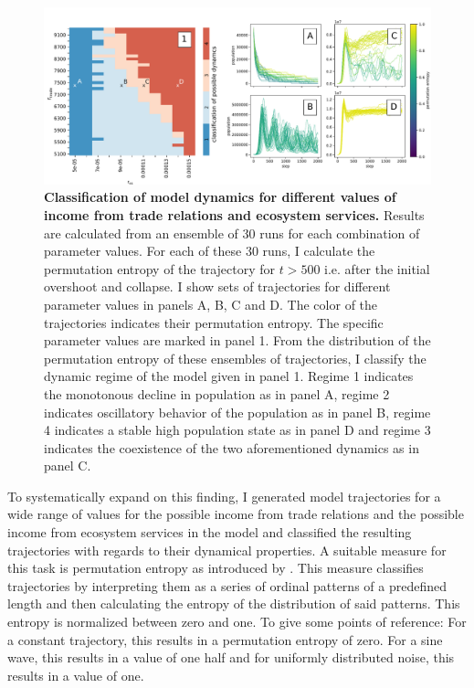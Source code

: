 \begin{figure}[!t]
\centering
\includegraphics[width=\textwidth]{figures/classified_dynamics.pdf}
\caption[Classification of model dynamics depending on income from ecosystem services and trade]{\textbf{Classification of model dynamics for different values of income from trade relations and ecosystem services.} Results are calculated from an ensemble of 30 runs for each combination of parameter values. For each of these 30 runs, I calculate the permutation entropy of the trajectory for $t>500$ i.e. after the initial overshoot and collapse. I show sets of trajectories for different parameter values in panels A, B, C and D. The color of the trajectories indicates their permutation entropy. The specific parameter values are marked in panel 1. From the distribution of the permutation entropy of these ensembles of trajectories, I classify the dynamic regime of the model given in panel 1. Regime 1 indicates the monotonous decline in population as in panel A, regime 2 indicates oscillatory behavior of the population as in panel B, regime 4 indicates a stable high population state as in panel D and regime 3 indicates the coexistence of the two aforementioned dynamics as in panel C.}
\label{fig:permutation_entropy}
\end{figure}


To systematically expand on this finding, I generated model trajectories for a wide range of values
for the possible income from trade relations and the possible income from ecosystem services in the model and classified the resulting trajectories with regards to their dynamical properties. A suitable measure for this task is permutation entropy as introduced by \cite{Bandt2002}. This measure classifies trajectories by interpreting them as a series of ordinal patterns of a predefined length and then calculating the entropy of the distribution of said patterns. This entropy is normalized between zero and one. To give some points of reference: For a constant trajectory, this results in a permutation entropy of zero. For a sine wave, this results in a value of one half and for uniformly distributed noise, this results in a value of one.

